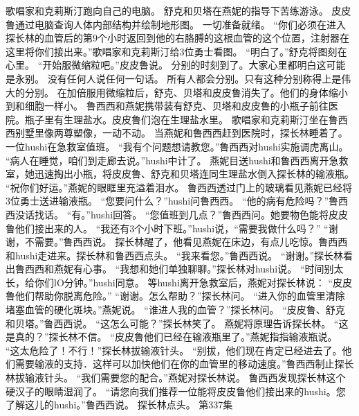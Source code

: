 \documentclass[a4paper,12pt,UTF8,twoside]{ctexbook}
\begin{document}
        歌唱家和克莉斯汀跑向自己的电脑。  
        舒克和贝塔在燕妮的指导下苦练游泳。  
        皮皮鲁通过电脑查询人体内部结构并绘制地形图。  
        一切准备就绪。  
        “你们必须在进入探长林的血管后的第9个小时返回到他的右胳膊的这根血管的这个位置，注射器在这里将你们接出来。”歌唱家和克莉斯汀给3位勇士看图。  
        “明白了。”舒克将图刻在心里。  
        “开始服微缩粒吧。”皮皮鲁说。  
        分别的时刻到了。大家心里都明白这可能是永别。  
        没有任何人说任何一句话。  
        所有人都会分别。只有这种分别称得上是伟大的分别。  
        在加倍服用微缩粒后，舒克、贝塔和皮皮鲁消失了。他们的身体缩小到和细胞一样小。  
        鲁西西和燕妮携带装有舒克、贝塔和皮皮鲁的小瓶子前往医院。瓶子里有生理盐水。皮皮鲁们泡在生理盐水里。  
        歌唱家和克莉斯汀坐在鲁西西别墅里像两尊塑像，一动不动。  
        当燕妮和鲁西西赶到医院时，探长林睡着了。  
        一位hushi在急救室值班。  
        “我有个问题想请教您。”鲁西西对hushi实施调虎离山。  
        “病人在睡觉，咱们到走廊去说。”hushi中计了。  
        燕妮目送hushi和鲁西西离开急救室，她迅速掏出小瓶，将皮皮鲁、舒克和贝塔连同生理盐水倒入探长林的输液瓶。  
        “祝你们好运。”燕妮的眼眶里充溢着泪水。  
        鲁西西透过门上的玻璃看见燕妮已经将3位勇士送进输液瓶。  
        “您要问什么？”hushi问鲁西西。  
        “他的病有危险吗？”鲁西西没话找话。  
        “有。”hushi回答。  
        “您值班到几点？”鲁西西问。她要物色能将皮皮鲁他们接出来的人。  
        “我还有3个小时下班。”hushi说，“需要我做什么吗？”        
        “谢谢，不需要。”鲁西西说。  
        探长林醒了，他看见燕妮在床边，有点儿吃惊。鲁西西和hushi走进来。探长林和鲁西西点头。  
        “我来看您。”鲁西西说。  
        “谢谢。”探长林看出鲁西西和燕妮有心事。  
        “我想和她们单独聊聊。”探长林对hushi说。  
        “时间别太长，给你们lO分钟。”hushi同意。  
        等hushi离开急救室后，燕妮对探长林说：  
        “皮皮鲁他们帮助你脱离危险。”  
        “谢谢。怎么帮助？”探长林问。  
        “进入你的血管里清除堵塞血管的硬化斑块。”燕妮说。  
        “谁进人我的血管？”探长林问。  
        “皮皮鲁、舒克和贝塔。”鲁西西说。  
        “这怎么可能？”探长林笑了。  
        燕妮将原理告诉探长林。  
        “这是真的？”探长林不信。  
        “皮皮鲁他们已经在输液瓶里了。”燕妮指指输液瓶说。  
        “这太危险了！不行！”探长林拔输液针头。  
        “别拔，他们现在肯定已经进去了。他们需要输液的支持．这样可以加快他们在你的血管里的移动速度。”鲁西西制止探长林拔输液针头。  
        “我们需要您的配合。”燕妮对探长林说。        
        鲁西西发现探长林这个硬汉子的眼睛湿润了。  
        “请您向我们推荐一位能将皮皮鲁他们接出来的hushi。您了解这儿的hushi。”鲁西西说。  
        探长林点头。          第337集  
\end{document}
